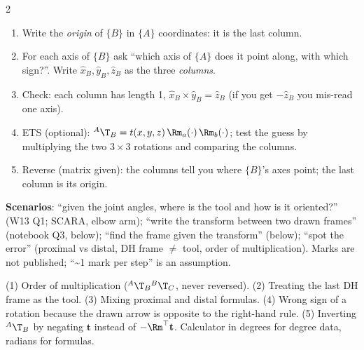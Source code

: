\begin{multicols}{2}
\begin{recipe}
\begin{enumerate}
\item Write the \emph{origin} of $\{B\}$ in $\{A\}$ coordinates: it is the last column.
\item For each axis of $\{B\}$ ask ``which axis of $\{A\}$ does it point along, with which sign?''. Write $\hat x_B,\hat y_B,\hat z_B$ as the three \emph{columns}.
\item Check: each column has length 1, $\hat x_B\times\hat y_B=\hat z_B$ (if you get $-\hat z_B$ you mis-read one axis).
\item ETS (optional): ${}^A\T_B=t(x,y,z)\,\Rm_{a}(\cdot)\,\Rm_{b}(\cdot)$; test the guess by multiplying the two $3\times3$ rotations and comparing the columns.
\item Reverse (matrix given): the columns tell you where $\{B\}$'s axes point; the last column is its origin.
\end{enumerate}
\end{recipe}

\textbf{Scenarios}: ``given the joint angles, where is the tool and how is it oriented?'' (W13 Q1; SCARA, elbow arm); ``write the transform between two drawn frames'' (notebook Q3, below); ``find the frame given the transform'' (below); ``spot the error'' (proximal vs distal, DH frame $\neq$ tool, order of multiplication). Marks are not published; ``\textasciitilde1 mark per step'' is an assumption.

\begin{trap}
(1) Order of multiplication (${}^A\T_B{}^B\T_C$, never reversed). (2) Treating the last DH frame as the tool. (3) Mixing proximal and distal formulas. (4) Wrong sign of a rotation because the drawn arrow is opposite to the right-hand rule. (5) Inverting ${}^A\T_B$ by negating $\mathbf t$ instead of $-\Rm^\top\mathbf t$. Calculator in degrees for degree data, radians for formulas.
\end{trap}


\end{multicols}
